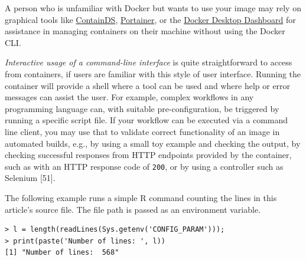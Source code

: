 \documentclass[10pt,letterpaper]{article}
\newenvironment{Shaded}{\begin{snugshade}}{\end{snugshade}}
\newcommand{\BuiltInTok}[1]{#1}
\newcommand{\ExtensionTok}[1]{#1}
\newcommand{\NormalTok}[1]{#1}
\newcommand{\StringTok}[1]{\textcolor[rgb]{0.31,0.60,0.02}{#1}}
\newcommand{\VariableTok}[1]{\textcolor[rgb]{0.00,0.00,0.00}{#1}}
\begin{document}
\normalsize

A person who is unfamiliar with Docker but wants to use your image may
rely on graphical tools like \href{https://containds.com/}{ContainDS},
\href{https://www.portainer.io/}{Portainer}, or the
\href{https://docs.docker.com/desktop/dashboard/}{Docker Desktop
Dashboard} for assistance in managing containers on their machine
without using the Docker CLI.

\emph{Interactive usage of a command-line interface} is quite
straightforward to access from containers, if users are familiar with
this style of user interface. Running the container will provide a shell
where a tool can be used and where help or error messages can assist the
user. For example, complex workflows in any programming language can,
with suitable pre-configuration, be triggered by running a specific
script file. If your workflow can be executed via a command line client,
you may use that to validate correct functionality of an image in
automated builds, e.g., by using a small toy example and checking the
output, by checking successful responses from HTTP endpoints provided by
the container, such as with an HTTP response code of \texttt{200}, or by
using a controller such as Selenium {[}51{]}.

The following example runs a simple R command counting the lines in this
article's source file. The file path is passed as an environment
variable.

\footnotesize

\begin{Shaded}
\end{Shaded}

\begin{verbatim}
> l = length(readLines(Sys.getenv('CONFIG_PARAM')));
> print(paste('Number of lines: ', l))
[1] "Number of lines:  568"
\end{verbatim}
\end{document}
